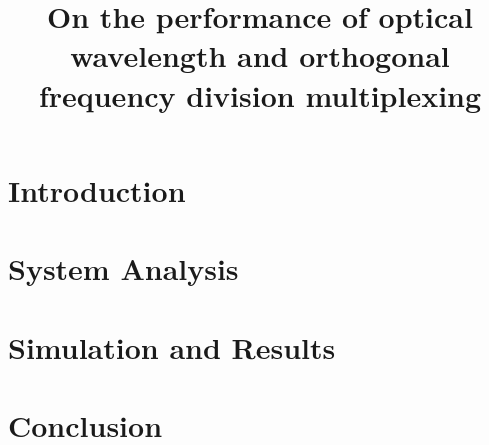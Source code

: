 \documentclass{sig-alternate} %
\begin{document}
\title{On the performance of optical wavelength and orthogonal frequency division multiplexing}
\maketitle

\begin{abstract}

\end{abstract}

\section{Introduction}

\section{System Analysis}

\section{Simulation and Results}

\section{Conclusion}
\end{document}
